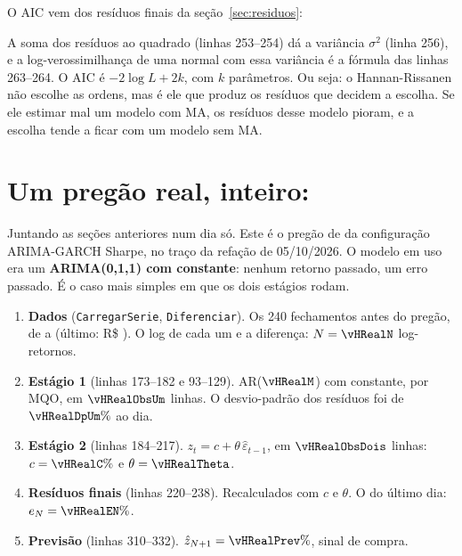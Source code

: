 \documentclass[11pt,a4paper]{article}
\newcommand{\cod}[1]{../../../tg/codigo/#1}
\newcommand{\trecho}[4]{}
\begin{document}
O AIC vem dos resíduos finais da seção~\ref{sec:residuos}:

\trecho{\cod{Arima.mqh}}{252}{264}{tg/codigo/Arima.mqh}

A soma dos resíduos ao quadrado (linhas 253--254) dá a variância $\sigma^2$ (linha 256), e a log-verossimilhança de uma
normal com essa variância é a fórmula das linhas 263--264. O AIC é $-2\log L + 2k$, com $k$ parâmetros. Ou seja: o
Hannan-Rissanen não escolhe as ordens, mas é ele que produz os resíduos que decidem a escolha. Se ele estimar mal um
modelo com MA, os resíduos desse modelo pioram, e a escolha tende a ficar com um modelo sem MA.

\section{Um pregão real, inteiro: \vHDiaReal}\label{sec:real}

Juntando as seções anteriores num dia só. Este é o pregão de \vHDiaReal{} da configuração ARIMA-GARCH Sharpe, no
traço da refação de 05/10/2026. O modelo em uso era um \textbf{ARIMA(0,1,1) com constante}: nenhum retorno passado, um
erro passado. É o caso mais simples em que os dois estágios rodam.

\begin{enumerate}[leftmargin=*, itemsep=2pt]
\item \textbf{Dados} (\texttt{CarregarSerie}, \texttt{Diferenciar}). Os 240 fechamentos antes do pregão, de \vHJanIni{} a
  \vHJanFim{} (último: R\$ \vHRealFechUlt). O log de cada um e a diferença: $N = \vHRealN$ log-retornos.
\item \textbf{Estágio 1} (linhas 173--182 e 93--129). AR($\vHRealM$) com constante, por MQO, em $\vHRealObsUm$ linhas. O
  desvio-padrão dos resíduos foi de $\vHRealDpUm\%$ ao dia.
\item \textbf{Estágio 2} (linhas 184--217). $z_t = c + \theta\,\hat\varepsilon_{t-1}$, em $\vHRealObsDois$ linhas:
  $c = \vHRealC\%$ e $\theta = \vHRealTheta$.
\item \textbf{Resíduos finais} (linhas 220--238). Recalculados com $c$ e $\theta$. O do último dia: $e_N = \vHRealEN\%$.
\item \textbf{Previsão} (linhas 310--332). $\hat z_{N+1} = \vHRealPrev\%$, sinal de compra.
\end{enumerate}
\end{document}
